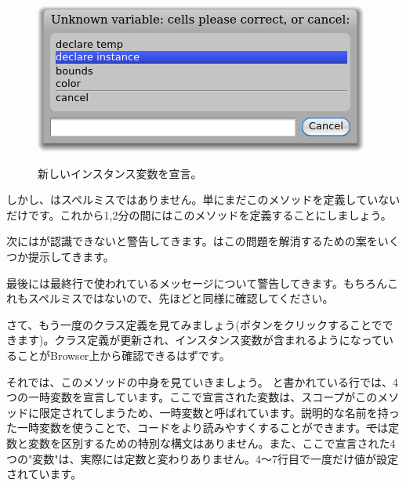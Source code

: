 \documentclass[a4paper,10pt,twoside]{book}
\begin{document}
\begin{figure}[htb]
\begin{minipage}{0.48\textwidth}
		{\includegraphics[scale=0.7]{DeclareInstanceVar}}
	\caption{新しいインスタンス変数を宣言。}
\end{minipage}
\end{figure}

しかし、はスペルミスではありません。単にまだこのメソッドを定義していないだけです。これから1,2分の間にはこのメソッドを定義することにしましょう。


次に\pharo はが認識できないと警告してきます。\pharo はこの問題を解消するための案をいくつか提示してきます。


最後に\pharo は最終行で使われているメッセージについて警告してきます。もちろんこれもスペルミスではないので、先ほどと同様に確認してください。


さて、もう一度のクラス定義を見てみましょう(ボタンをクリックすることでできます)。クラス定義が更新され、インスタンス変数が含まれるようになっていることがBrowser上から確認できるはずです。

それでは、このメソッドの中身を見ていきましょう。
と書かれている行では、4つの一時変数を宣言しています。ここで宣言された変数は、スコープがこのメソッドに限定されてしまうため、一時変数と呼ばれています。説明的な名前を持った一時変数を使うことで、コードをより読みやすくすることができます。\st では定数と変数を区別するための特別な構文はありません。また、ここで宣言された4つの"変数"は、実際には定数と変わりありません。4〜7行目で一度だけ値が設定されています。
\end{document}
